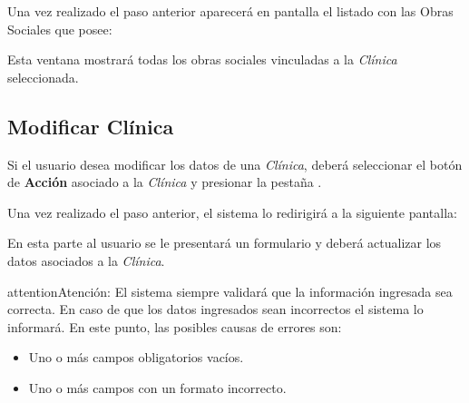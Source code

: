 \documentclass[a4paper,10pt,spanish]{sphinxmanual}
\begin{document}

Una vez realizado el paso anterior aparecerá en pantalla el listado con las Obras Sociales que posee:


Esta ventana mostrará todas los obras sociales vinculadas a la \emph{Clínica} seleccionada.


\subsection{Modificar Clínica}
\label{clinicas:modificar-clinica}\label{clinicas:id3}
Si el usuario desea modificar los datos de una \emph{Clínica}, deberá seleccionar el botón de \textbf{Acción} asociado a la \emph{Clínica} y presionar la pestaña .


Una vez realizado el paso anterior, el sistema lo redirigirá a la siguiente pantalla:


En esta parte al usuario se le presentará un formulario y deberá actualizar los datos asociados a la \emph{Clínica}.

\begin{notice}{attention}{Atención:}
El sistema siempre validará que la información ingresada sea correcta. En caso de que los datos ingresados sean incorrectos el sistema lo informará.
En este punto, las posibles causas de errores son:
\begin{itemize}
\item {} 
Uno o más campos obligatorios vacíos.

\item {} 
Uno o más campos con un formato incorrecto.

\end{itemize}
\end{notice}
\end{document}
